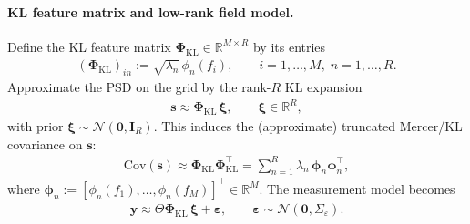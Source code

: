 \documentclass[11pt,a4paper]{report}
\theoremstyle{definition}
\providecommand{\ve}[1]{{\boldsymbol{#1}}}
\providecommand{\mat}[1]{{\pmb{#1}}}
\begin{document}
\paragraph{KL feature matrix and low-rank field model.}
Define the KL feature matrix $\boldsymbol{\Phi}_{\!\mathrm{KL}}{\in}\mathbb{R}^{M\times R}$ by its entries
\begin{align}
	(\boldsymbol{\Phi}_{\!\mathrm{KL}})_{in} := \sqrt{\lambda_n}\,\phi_n(f_i),
	\qquad i=1,\dots,M,\; n=1,\dots,R.
\end{align}
Approximate the PSD on the grid by the rank-$R$ KL expansion
\begin{align}
	\ve{s} \approx \boldsymbol{\Phi}_{\!\mathrm{KL}}\,\boldsymbol{\xi},
	\qquad \boldsymbol{\xi}\in\mathbb{R}^R,
\end{align}
with prior $\boldsymbol{\xi}{\sim}\mathcal{N}(\ve{0},\mat{I}_R)$.
This induces the (approximate) truncated Mercer/KL covariance on $\ve{s}$:
\begin{align}
	\mathrm{Cov}(\ve{s})
	\approx \boldsymbol{\Phi}_{\!\mathrm{KL}}\boldsymbol{\Phi}_{\!\mathrm{KL}}^\top
	= \sum_{n=1}^R \lambda_n\,\boldsymbol{\phi}_n \boldsymbol{\phi}_n^\top,
\end{align}
where $\boldsymbol{\phi}_n := [\phi_n(f_1),\dots,\phi_n(f_M)]^\top\in\mathbb{R}^M$.
The measurement model becomes
\begin{align}
	\ve{y} \approx \mat{\varTheta}\boldsymbol{\Phi}_{\!\mathrm{KL}}\,\boldsymbol{\xi} + \ve{\varepsilon},
	\qquad \ve{\varepsilon}\sim\mathcal{N}(\ve{0},\boldsymbol{\varSigma}_{\varepsilon}).
\end{align}
\end{document}
